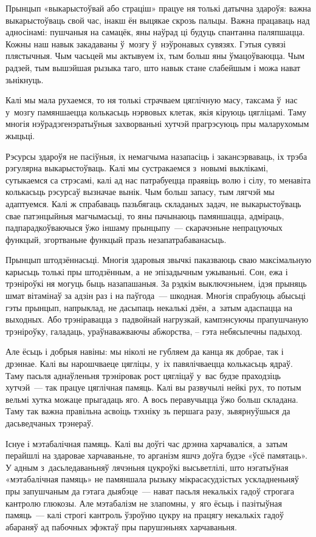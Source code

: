 Прынцып «выкарыстоўвай або страціш» працуе ня толькі датычна здароўя: важна выкарыстоўваць свой час, інакш ён выцякае скрозь пальцы. Важна працаваць над адносінамі: пушчаныя на самацёк, яны наўрад ці будуць спантанна паляпшацца. Кожны наш навык закадаваны ў~мозгу ў~нэўронавых сувязях. Гэтыя сувязі плястычныя. Чым часьцей мы актывуем іх, тым больш яны ўмацоўваюцца. Чым радзей, тым вышэйшая рызыка таго, што навык стане слабейшым і можа нават зьнікнуць.

Калі мы мала рухаемся, то ня толькі страчваем цяглічную масу, таксама ў~нас у~мозгу памяншаецца колькасьць нэрвовых клетак, якія кіруюць цягліцамі. Таму многія нэўрадэгенэратыўныя захворваньні хутчэй прагрэсуюць пры маларухомым жыцьці.

Рэсурсы здароўя не пасіўныя, іх немагчыма назапасіць і закансэрваваць, іх трэба рэгулярна выкарыстоўваць. Калі мы сустракаемся з~новымі выклікамі, сутыкаемся са стрэсамі, калі ад нас патрабуецца праявіць волю і сілу, то менавіта колькасьць рэсурсаў вызначае вынік. Чым больш запасу, тым лягчэй мы адаптуемся. Калі ж спрабаваць пазьбягаць складаных задач, не выкарыстоўваць свае патэнцыйныя магчымасьці, то яны пачынаюць памяншацца, адміраць, падпарадкоўваючыся ўжо іншаму прынцыпу~--- скарачэньне непрацуючых функцый, згортваньне функцый празь незапатрабаванасьць.

Прынцып штодзённасьці. Многія здаровыя звычкі паказваюць сваю максімальную карысьць толькі пры штодзённым, а~не эпізадычным ужываньні. Сон, ежа і трэніроўкі ня могуць быць назапашаныя. За рэдкім выключэньнем, ідэя прыняць шмат вітамінаў за адзін раз і на паўгода~--- шкодная. Многія спрабуюць абысьці гэты прынцып, напрыклад, не дасыпаць некалькі дзён, а~затым адаспацца на выходных. Або трэніравацца з~падвойнай нагрузкай, кампэнсуючы прапушчаную трэніроўку, галадаць, ураўнаважваючы абжорства, -- гэта небясьпечны падыход.

Але ёсьць і добрыя навіны: мы ніколі не губляем да канца як добрае, так і дрэннае. Калі вы нарошчваеце цягліцы, у~іх павялічваецца колькасьць ядраў. Таму пасьля аднаўленьня трэніровак рост цягліцаў у~вас будзе праходзіць хутчэй~--- так працуе цяглічная памяць. Калі вы развучылі нейкі рух, то потым вельмі хутка можаце прыгадаць яго. А вось перавучыцца ўжо больш складана. Таму так важна правільна асвоіць тэхніку зь першага разу, зьвярнуўшыся да дасьведчаных трэнераў.

Існуе і мэтабалічная памяць. Калі вы доўгі час дрэнна харчаваліся, а~затым перайшлі на здаровае харчаваньне, то арганізм яшчэ доўга будзе «ўсё памятаць». У адным з~дасьледаваньняў лячэньня цукроўкі высьветлілі, што нэгатыўная «мэтабалічная памяць» не памяншала рызыку мікрасасудзістых ускладненьняў пры запушчаным да гэтага дыябэце~--- нават пасьля некалькіх гадоў строгага кантролю глюкозы. Але мэтабалізм не злапомны, у~яго ёсьць і пазітыўная памяць~--- калі строгі кантроль ўзроўню цукру на працягу некалькіх гадоў абараняў ад пабочных эфэктаў пры парушэньнях харчаваньня.

